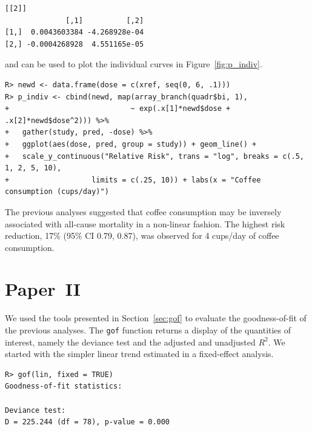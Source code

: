 \documentclass[11pt,a4paper,twoside,openany]{book}\usepackage{knitr}
\begin{document}
{{\begin{knitrout}
\begin{kframe}
\begin{verbatim}
[[2]]
              [,1]          [,2]
[1,]  0.0043603384 -4.268928e-04
[2,] -0.0004268928  4.551165e-05
\end{verbatim}
\end{kframe}
\end{knitrout}

\noindent and can be used to plot the individual curves in Figure~\ref{fig:p_indiv}.
\begin{knitrout}\footnotesize
{}\color{fgcolor}\begin{kframe}
\begin{verbatim}
R> newd <- data.frame(dose = c(xref, seq(0, 6, .1)))
R> p_indiv <- cbind(newd, map(array_branch(quadr$bi, 1),
+                            ~ exp(.x[1]*newd$dose + .x[2]*newd$dose^2))) %>%
+   gather(study, pred, -dose) %>%
+   ggplot(aes(dose, pred, group = study)) + geom_line() +
+   scale_y_continuous("Relative Risk", trans = "log", breaks = c(.5, 1, 2, 5, 10), 
+                   limits = c(.25, 10)) + labs(x = "Coffee consumption (cups/day)")
\end{verbatim}
\end{kframe}
\end{knitrout}

\noindent The previous analyses suggested that coffee consumption may be inversely associated with all-cause mortality in a non-linear fashion. The highest risk reduction, 17\% (95\% CI 0.79, 0.87), was observed for 4 cups/day of coffee consumption.


\section{Paper~II}\label{sec:res_paperII}



We used the tools presented in Section~\ref{sec:gof} to evaluate the goodness-of-fit of the previous analyses. The \texttt{gof} function returns a display of the quantities of interest, namely the deviance test and the adjusted and unadjusted $R^2$. 
We started with the simpler linear trend estimated in a fixed-effect analysis.
\begin{knitrout}\footnotesize
{}\color{fgcolor}\begin{kframe}
\begin{verbatim}
R> gof(lin, fixed = TRUE)
Goodness-of-fit statistics:

Deviance test: 
D = 225.244 (df = 78), p-value = 0.000


\end{verbatim}
\end{kframe}
\end{knitrout}}}
\end{document}
